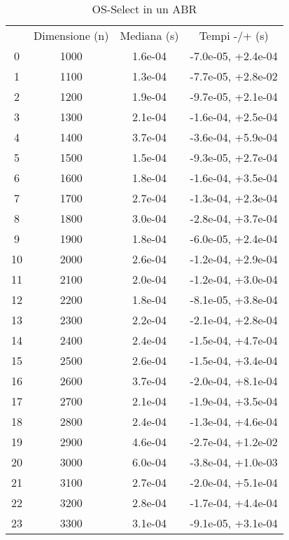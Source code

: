 \begin{table}
\centering
\caption{OS-Select in un ABR}
\label{OS-Select in un ABR}
\begin{adjustbox}{width=1\textwidth/2}
\begin{tabular}{|c|c|c|c|}
\hline
 & Dimensione (n) & Mediana (s) & Tempi -/+ (s) \\
0 & 1000 & 1.6e-04 & -7.0e-05, +2.4e-04 \\
\cline{1-4}
1 & 1100 & 1.3e-04 & -7.7e-05, +2.8e-02 \\
\cline{1-4}
2 & 1200 & 1.9e-04 & -9.7e-05, +2.1e-04 \\
\cline{1-4}
3 & 1300 & 2.1e-04 & -1.6e-04, +2.5e-04 \\
\cline{1-4}
4 & 1400 & 3.7e-04 & -3.6e-04, +5.9e-04 \\
\cline{1-4}
5 & 1500 & 1.5e-04 & -9.3e-05, +2.7e-04 \\
\cline{1-4}
6 & 1600 & 1.8e-04 & -1.6e-04, +3.5e-04 \\
\cline{1-4}
7 & 1700 & 2.7e-04 & -1.3e-04, +2.3e-04 \\
\cline{1-4}
8 & 1800 & 3.0e-04 & -2.8e-04, +3.7e-04 \\
\cline{1-4}
9 & 1900 & 1.8e-04 & -6.0e-05, +2.4e-04 \\
\cline{1-4}
10 & 2000 & 2.6e-04 & -1.2e-04, +2.9e-04 \\
\cline{1-4}
11 & 2100 & 2.0e-04 & -1.2e-04, +3.0e-04 \\
\cline{1-4}
12 & 2200 & 1.8e-04 & -8.1e-05, +3.8e-04 \\
\cline{1-4}
13 & 2300 & 2.2e-04 & -2.1e-04, +2.8e-04 \\
\cline{1-4}
14 & 2400 & 2.4e-04 & -1.5e-04, +4.7e-04 \\
\cline{1-4}
15 & 2500 & 2.6e-04 & -1.5e-04, +3.4e-04 \\
\cline{1-4}
16 & 2600 & 3.7e-04 & -2.0e-04, +8.1e-04 \\
\cline{1-4}
17 & 2700 & 2.1e-04 & -1.9e-04, +3.5e-04 \\
\cline{1-4}
18 & 2800 & 2.4e-04 & -1.3e-04, +4.6e-04 \\
\cline{1-4}
19 & 2900 & 4.6e-04 & -2.7e-04, +1.2e-02 \\
\cline{1-4}
20 & 3000 & 6.0e-04 & -3.8e-04, +1.0e-03 \\
\cline{1-4}
21 & 3100 & 2.7e-04 & -2.0e-04, +5.1e-04 \\
\cline{1-4}
22 & 3200 & 2.8e-04 & -1.7e-04, +4.4e-04 \\
\cline{1-4}
23 & 3300 & 3.1e-04 & -9.1e-05, +3.1e-04 \\

\end{tabular}
\end{adjustbox}
\end{table}
